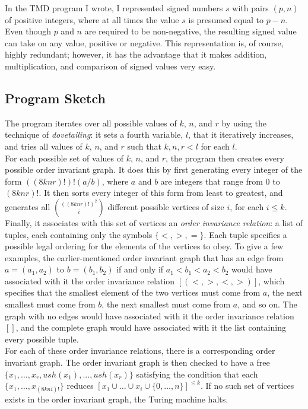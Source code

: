 In the TMD program I wrote, I represented signed numbers $s$ with pairs $(p, n)$ of positive integers, where at all times the value $s$ is presumed equal to $p - n$. Even though $p$ and $n$ are required to be non-negative, the resulting signed value can take on any value, positive or negative. This representation is, of course, highly redundant; however, it has the advantage that it makes addition, multiplication, and comparison of signed values very easy.

\subsection{Program Sketch}

The program iterates over all possible values of $k$, $n$, and $r$ by using the technique of \emph{dovetailing}: it sets a fourth variable, $l$, that it iteratively increases, and tries all values of $k$, $n$, and $r$ such that $k, n, r < l$ for each $l$. \\

For each possible set of values of $k$, $n$, and $r$, the program then creates every possible order invariant graph. It does this by first generating every integer of the form $((8knr)!)!(a / b)$, where $a$ and $b$ are integers that range from 0 to $(8knr)!$. It then sorts every integer of this form from least to greatest, and generates all ${((8knr)!)^2 \choose i}$ different possible vertices of size $i$, for each $i \le k$. Finally, it associates with this set of vertices an \emph{order invariance relation}: a list of tuples, each containing only the symbols $\{<, >, =\}$. Each tuple specifies a possible legal ordering for the elements of the vertices to obey. To give a few examples, the earlier-mentioned order invariant graph that has an edge from $a = (a_1, a_2)$ to $b = (b_1, b_2)$ if and only if $a_1 < b_1 < a_2 < b_2$ would have associated with it the order invariance relation $[(<, >, <, >)]$, which specifies that the smallest element of the two vertices must come from $a$, the next smallest must come from $b$, the next smallest must come from $a$, and so on. The graph with no edges would have associated with it the order invariance relation $[]$, and the complete graph would have associated with it the list containing every possible tuple. \\

For each of these order invariance relations, there is a corresponding order invariant graph. The order invariant graph is then checked to have a free $\{x_1,\dots,x_r, ush(x_1),...,ush(x_r)\}$ satisfying the condition that each $\{x_1, \dots, x_{(8kni)!}\}$ reduces $[x_1 \cup \dots \cup x_i \cup \{0,\dots,n\}]^{\le k}$. If no such set of vertices exists in the order invariant graph, the Turing machine halts. \\

